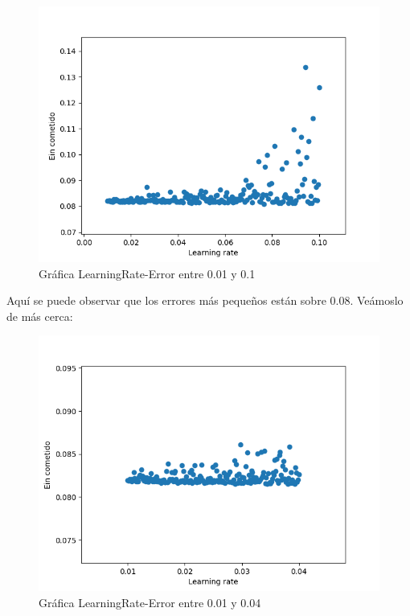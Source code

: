 \begin{figure}[H] %
	\centering
	\includegraphics[scale=0.6]{error2.png}  %
	\caption{Gráfica LearningRate-Error entre 0.01 y 0.1} 
	\label{fig:error2}
\end{figure}

Aquí se puede observar que los errores más pequeños están sobre 0.08. Veámoslo de más cerca:

\begin{figure}[H] %
	\centering
	\includegraphics[scale=0.6]{error3.png}  %
	\caption{Gráfica LearningRate-Error entre 0.01 y 0.04} 
	\label{fig:error3}
\end{figure}


